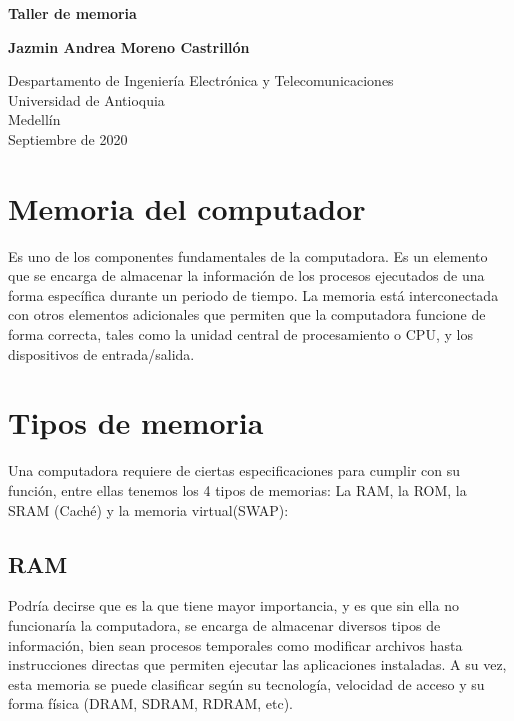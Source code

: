 ﻿\documentclass{article}
\begin{document}
\begin{titlepage}
    \begin{center}
        \vspace*{1cm}
            
        \Huge
        \textbf{Taller de memoria}
            
        \vspace{0.5cm}
        \LARGE
       
            
        \vspace{1.5cm}
            
        \textbf{Jazmin Andrea Moreno Castrillón}
            
        \vfill
            
        \vspace{0.8cm}
            
        \Large
        Despartamento de Ingeniería Electrónica y Telecomunicaciones\\
        Universidad de Antioquia\\
        Medellín\\
        Septiembre de 2020
            
    \end{center}
\end{titlepage}

\tableofcontents
\newpage
\section{Memoria del computador}\label{contenido}
Es uno de los componentes fundamentales de la computadora. Es un elemento que se encarga de almacenar la información de los procesos ejecutados de una forma específica durante un periodo de tiempo. La memoria está interconectada con otros elementos adicionales que permiten que la computadora funcione de forma correcta, tales como la unidad central de procesamiento o CPU, y los dispositivos de entrada/salida. 

\section{Tipos de memoria} \label{contenido}
Una computadora requiere de ciertas especificaciones para cumplir con su función, entre ellas tenemos los 4 tipos de memorias: La RAM, la ROM, la SRAM (Caché) y la memoria virtual(SWAP):
\subsection{RAM}
Podría decirse que es la que tiene mayor importancia, y es que sin ella no funcionaría la computadora, se encarga de almacenar diversos tipos de información, bien sean procesos temporales como modificar archivos hasta instrucciones directas que permiten ejecutar las aplicaciones instaladas. A su vez, esta memoria se puede clasificar según su tecnología, velocidad de acceso y su forma física (DRAM, SDRAM, RDRAM, etc).
\end{document}

